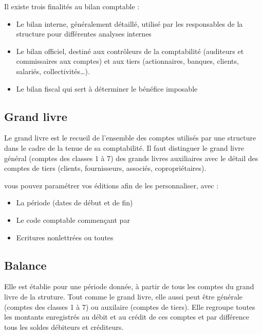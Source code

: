 \documentclass[a4paper,10pt,oneside,french]{sphinxmanual}
\begin{document}
\sphinxAtStartPar
Il existe trois finalités au bilan comptable :
\begin{itemize}
\item {} 
\sphinxAtStartPar
Le bilan interne, généralement détaillé, utilisé par les responsables de la structure pour différentes analyses internes

\item {} 
\sphinxAtStartPar
Le bilan officiel, destiné aux contrôleurs de la comptabilité (auditeurs et commissaires aux comptes) et aux tiers (actionnaires, banques, clients, salariés, collectivités…).

\item {} 
\sphinxAtStartPar
Le bilan fiscal qui sert à déterminer le bénéfice imposable

\end{itemize}


\subsection{Grand livre}
\label{\detokenize{accounting/reporting:grand-livre}}
\sphinxAtStartPar
Le grand livre est le recueil de l’ensemble des comptes utilisés par une structure dans le cadre de la tenue de sa comptabilité.
Il faut distinguer le grand livre général (comptes des classes 1 à 7) des grands livres auxiliaires avec le détail des comptes de tiers (clients, fournisseurs, associés, copropriétaires).

\sphinxAtStartPar
vous pouvez paramétrer vos éditions afin de les personnaliser, avec :
\begin{itemize}
\item {} 
\sphinxAtStartPar
La période (dates de début et de fin)

\item {} 
\sphinxAtStartPar
Le code comptable commençant par

\item {} 
\sphinxAtStartPar
Ecritures non\sphinxhyphen{}lettrées ou toutes

\end{itemize}


\subsection{Balance}
\label{\detokenize{accounting/reporting:balance}}
\sphinxAtStartPar
Elle est établie pour une période donnée, à partir de tous les comptes du grand livre de la struture. Tout comme le grand livre, elle aussi peut être générale (comptes des classes 1 à 7) ou auxilaire (comptes de tiers). Elle regroupe toutes les montants enregistrés au débit et au crédit de ces comptes et par différence tous les soldes débiteurs et créditeurs.
\end{document}
